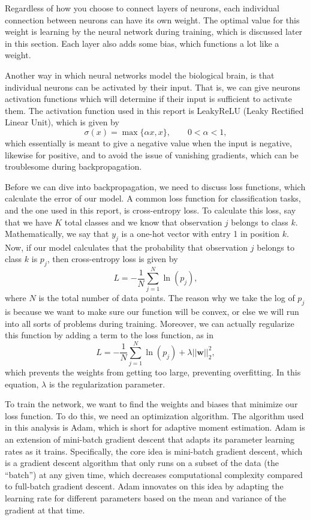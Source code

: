 \documentclass[a4paper,10 pt]{article}
\begin{document}
Regardless of how you choose to connect layers of neurons, each individual connection between neurons can have its own weight. The optimal value for this weight is learning by the neural network during training, which is discussed later in this section. Each layer also adds some bias, which functions a lot like a weight.

Another way in which neural networks model the biological brain, is that individual neurons can be activated by their input. That is, we can give neurons activation functions which will determine if their input is sufficient to activate them. The activation function used in this report is LeakyReLU (Leaky Rectified Linear Unit), which is given by
\begin{equation}
    \sigma(x) = \max\{\alpha x, x\},\quad\quad 0<\alpha<1,
\end{equation}
which essentially is meant to give a negative value when the input is negative, likewise for positive, and to avoid the issue of vanishing gradients, which can be troublesome during backpropagation. 

Before we can dive into backpropagation, we need to discuss loss functions, which calculate the error of our model. A common loss function for classification tasks, and the one used in this report, is cross-entropy loss. To calculate this loss, say that we have $K$ total classes and we know that observation $j$ belongs to class $k$. Mathematically, we say that $y_j$ is a one-hot vector with entry 1 in position $k$. Now, if our model calculates that the probability that observation $j$ belongs to class $k$ is $p_j$, then cross-entropy loss is given by
\begin{equation}
    L = -\frac{1}{N}\sum_{j=1}^N \ln(p_j),
\end{equation}
where $N$ is the total number of data points. The reason why we take the log of $p_j$ is because we want to make sure our function will be convex, or else we will run into all sorts of problems during training. Moreover, we can actually regularize this function by adding a term to the loss function, as in 
\begin{equation}
    L = -\frac{1}{N}\sum_{j=1}^N \ln(p_j) + \lambda ||\mathbf{w}||_2^2,
\end{equation}
which prevents the weights from getting too large, preventing overfitting. In this equation, $\lambda$ is the regularization parameter. 

To train the network, we want to find the weights and biases that minimize our loss function. To do this, we need an optimization algorithm. The algorithm used in this analysis is Adam, which is short for adaptive moment estimation. Adam is an extension of mini-batch gradient descent that adapts its parameter learning rates as it trains. Specifically, the core idea is mini-batch gradient descent, which is a gradient descent algorithm that only runs on a subset of the data (the ``batch'') at any given time, which decreases computational complexity compared to full-batch gradient descent. Adam innovates on this idea by adapting the learning rate for different parameters based on the mean and variance of the gradient at that time.
\end{document}
